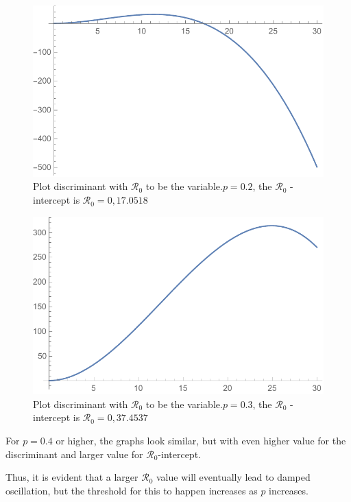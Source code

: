 \documentclass[12pt]{article}
\newcommand{\R}{\mathcal{R}}
\begin{document}
\begin{figure}[H]
  \caption{Plot discriminant with $\R_0$ to be the variable.$p=0.2$, the $\R_0$ -intercept is $\R_0 = 0, 17.0518$}
  \centering
  \includegraphics[width=1.1\textwidth]{Figures/Plot_R_0_p_0_2.pdf}
\end{figure}

\begin{figure}[H]
  \caption{Plot discriminant with $\mathcal{R}_0$ to be the variable.$p=0.3$, the $\mathcal{R}_0$ -intercept is $\mathcal{R}_0 = 0, 37.4537$}
  \centering
  \includegraphics[width=1.1\textwidth]{Figures/Plot_R_0_p_0_3.pdf}
\end{figure}

For $p=0.4$ or higher, the graphs look similar, but with even higher value for the discriminant and larger value for $\R_0$-intercept.

Thus, it is evident that a larger $\R_0$ value will eventually lead to damped oscillation, but the threshold for this to happen increases as $p$ increases.
\end{document}
